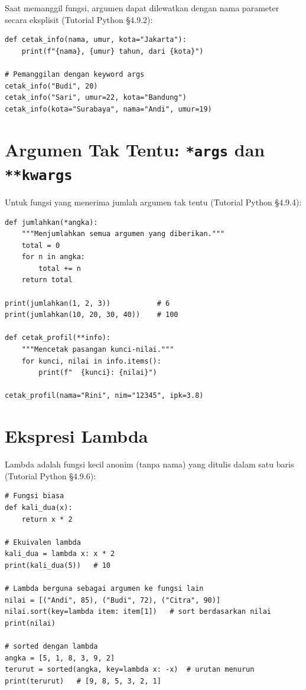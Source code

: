 ﻿\documentclass[../main.tex]{subfiles}
\begin{document}
Saat memanggil fungsi, argumen dapat dilewatkan dengan nama parameter secara eksplisit (Tutorial Python §4.9.2):

\begin{lstlisting}[caption=Keyword arguments]
def cetak_info(nama, umur, kota="Jakarta"):
    print(f"{nama}, {umur} tahun, dari {kota}")

# Pemanggilan dengan keyword args
cetak_info("Budi", 20)
cetak_info("Sari", umur=22, kota="Bandung")
cetak_info(kota="Surabaya", nama="Andi", umur=19)
\end{lstlisting}

\section{Argumen Tak Tentu: \texttt{*args} dan \texttt{**kwargs}}

Untuk fungsi yang menerima jumlah argumen tak tentu (Tutorial Python §4.9.4):

\begin{lstlisting}[caption=*args dan **kwargs]
def jumlahkan(*angka):
    """Menjumlahkan semua argumen yang diberikan."""
    total = 0
    for n in angka:
        total += n
    return total

print(jumlahkan(1, 2, 3))           # 6
print(jumlahkan(10, 20, 30, 40))    # 100

def cetak_profil(**info):
    """Mencetak pasangan kunci-nilai."""
    for kunci, nilai in info.items():
        print(f"  {kunci}: {nilai}")

cetak_profil(nama="Rini", nim="12345", ipk=3.8)
\end{lstlisting}

\section{Ekspresi Lambda}

Lambda adalah fungsi kecil anonim (tanpa nama) yang ditulis dalam satu baris (Tutorial Python §4.9.6):

\begin{lstlisting}[caption=Lambda expressions]
# Fungsi biasa
def kali_dua(x):
    return x * 2

# Ekuivalen lambda
kali_dua = lambda x: x * 2
print(kali_dua(5))   # 10

# Lambda berguna sebagai argumen ke fungsi lain
nilai = [("Andi", 85), ("Budi", 72), ("Citra", 90)]
nilai.sort(key=lambda item: item[1])   # sort berdasarkan nilai
print(nilai)

# sorted dengan lambda
angka = [5, 1, 8, 3, 9, 2]
terurut = sorted(angka, key=lambda x: -x)  # urutan menurun
print(terurut)   # [9, 8, 5, 3, 2, 1]
\end{lstlisting}
\end{document}
